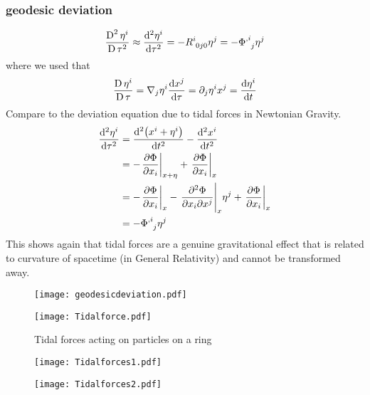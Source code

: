 \subsubsection{geodesic deviation}
\begin{equation}
    \frac{\difD^2 \eta^i}{\difD \tau^2} \approx \frac{\dif{}^2 \eta^i}{\dif{} \tau^2} 
    = - \tensor{R}{^i_0_j_0} \eta^j = - \tensor{\Phi}{^,^i_j}\tensor{\eta}{^j}
\end{equation}
where we used that
\begin{equation}
    \frac{\difD{} \eta^i}{\difD{} \tau} = \nabla_j \eta^i \frac{\dif x^j}{\dif \tau} = \partial_j \eta^i x^j = \frac{\dif \eta^i}{\dif t}
\end{equation}
Compare to the deviation equation due to tidal forces in Newtonian Gravity.
\begin{equation}
    \begin{split}
        \frac{\dif{}^2 \eta^i}{\dif \tau^2} &= \frac{\dif{}^2 \left( x^i + \eta^i \right)}{\dif{} t^2} - \frac{\dif{}^2 x^i}{\dif{}t^2} \\
        &= - \left. \frac{\partial \Phi}{\partial x_i} \right|_{x+\eta} + \left. \frac{\partial \Phi}{\partial x_i} \right|_{x} \\
        &= - \left. \frac{\partial \Phi}{\partial x_i} \right|_{x} 
        - \left. \frac{\partial^2 \Phi}{\partial x_i \partial x^j} \right|_{x} \eta^j 
        + \left. \frac{\partial \Phi}{\partial x_i} \right|_{x} \\
        &= - \tensor{\Phi}{^,^i_j} \eta^j
    \end{split}
\end{equation}
This shows again that tidal forces are a genuine gravitational effect that is related to curvature of spacetime (in General Relativity) 
and cannot be transformed away.
\begin{figure}[hbtp!]
\centering
 \texttt{[image: geodesicdeviation.pdf]}
\caption{}
\end{figure}
\begin{figure}[hbtp!]
\centering
 \texttt{[image: Tidalforce.pdf]}
\caption{Tidal forces acting on particles on a ring }
\end{figure}
\begin{figure}[hbtp!]
\centering
 \texttt{[image: Tidalforces1.pdf]}
\end{figure}

\begin{figure}[hbtp!]
\centering
 \texttt{[image: Tidalforces2.pdf]}
\end{figure}


